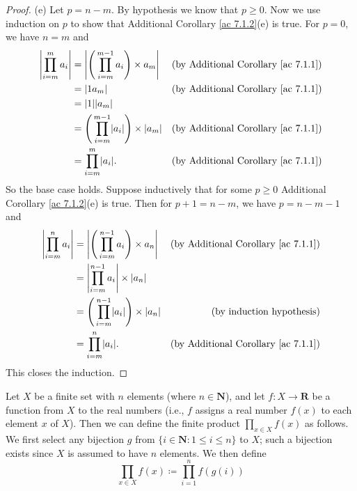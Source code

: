 \begin{proof}{(e)}
    Let \(p = n - m\).
    By hypothesis we know that \(p \geq 0\).
    Now we use induction on \(p\) to show that Additional Corollary \ref{ac 7.1.2}(e) is true.
    For \(p = 0\), we have \(n = m\) and
    \begin{align*}
        \abs*{\prod_{i = m}^m a_i} & = \abs*{\Bigg(\prod_{i = m}^{m - 1} a_i\Bigg) \times a_m}        & \text{(by Additional Corollary \ref{ac 7.1.1})} \\
                                   & = \abs*{1a_m}                                                    & \text{(by Additional Corollary \ref{ac 7.1.1})} \\
                                   & = \abs*{1}\abs*{a_m}                                                                                               \\
                                   & = \Bigg(\prod_{i = m}^{m - 1} \abs*{a_i}\Bigg) \times \abs*{a_m} & \text{(by Additional Corollary \ref{ac 7.1.1})} \\
                                   & = \prod_{i = m}^m \abs*{a_i}.                                    & \text{(by Additional Corollary \ref{ac 7.1.1})}
    \end{align*}
    So the base case holds.
    Suppose inductively that for some \(p \geq 0\) Additional Corollary \ref{ac 7.1.2}(e) is true.
    Then for \(p + 1 = n - m\), we have \(p = n - m - 1\) and
    \begin{align*}
        \abs*{\prod_{i = m}^n a_i} & = \abs*{\Bigg(\prod_{i = m}^{n - 1} a_i\Bigg) \times a_n}        & \text{(by Additional Corollary \ref{ac 7.1.1})} \\
                                   & = \abs*{\prod_{i = m}^{n - 1} a_i} \times \abs*{a_n}                                                               \\
                                   & = \Bigg(\prod_{i = m}^{n - 1} \abs*{a_i}\Bigg) \times \abs*{a_n} & \text{(by induction hypothesis)}                \\
                                   & = \prod_{i = m}^n \abs*{a_i}.                                    & \text{(by Additional Corollary \ref{ac 7.1.1})}
    \end{align*}
    This closes the induction.
\end{proof}

\begin{additional corollary}\label{ac 7.1.3}
Let \(X\) be a finite set with \(n\) elements (where \(n \in \mathbf{N}\)), and let \(f : X \to \mathbf{R}\) be a function from \(X\) to the real numbers
(i.e., \(f\) assigns a real number \(f(x)\) to each element \(x\) of \(X\)).
Then we can define the finite product \(\prod_{x \in X} f(x)\) as follows.
We first select any bijection \(g\) from \(\{i \in \mathbf{N} : 1 \leq i \leq n\}\) to \(X\);
such a bijection exists since \(X\) is assumed to have \(n\) elements.
We then define
\[
    \prod_{x \in X} f(x) \coloneqq \prod_{i = 1}^n f(g(i))
\]
\end{additional corollary}

